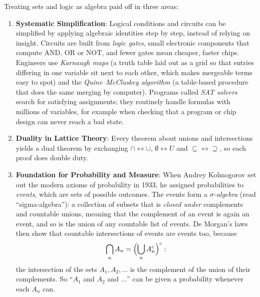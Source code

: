 Treating sets and logic as algebra paid off in three areas:
\begin{enumerate}
  \item \textbf{Systematic Simplification}: Logical conditions and circuits can be simplified by applying algebraic identities step by step, instead of relying on insight. Circuits are built from \emph{logic gates}, small electronic components that compute AND, OR or NOT, and fewer gates mean cheaper, faster chips. Engineers use \emph{Karnaugh maps} (a truth table laid out as a grid so that entries differing in one variable sit next to each other, which makes mergeable terms easy to spot) and the \emph{Quine--McCluskey algorithm} (a table-based procedure that does the same merging by computer). Programs called \emph{SAT solvers} search for satisfying assignments; they routinely handle formulas with millions of variables, for example when checking that a program or chip design can never reach a bad state.
  \item \textbf{Duality in Lattice Theory}: Every theorem about unions and intersections yields a dual theorem by exchanging $\cap \leftrightarrow \cup$, $\emptyset \leftrightarrow U$ and $\subseteq \leftrightarrow \supseteq$, so each proof does double duty.
  \item \textbf{Foundation for Probability and Measure}: When Andrey Kolmogorov set out the modern axioms of probability in 1933, he assigned probabilities to \emph{events}, which are sets of possible outcomes. The events form a \emph{$\sigma$-algebra} (read ``sigma-algebra''): a collection of subsets that is \emph{closed under} complements and countable unions, meaning that the complement of an event is again an event, and so is the union of any countable list of events. De Morgan's laws then show that countable intersections of events are events too, because
  \[
  \bigcap_{n} A_n = \Bigl(\bigcup_{n} A_n^c\Bigr)^c :
  \]
  the intersection of the sets $A_1, A_2, \dots$ is the complement of the union of their complements. So ``$A_1$ and $A_2$ and $\dots$'' can be given a probability whenever each $A_n$ can.
\end{enumerate}

